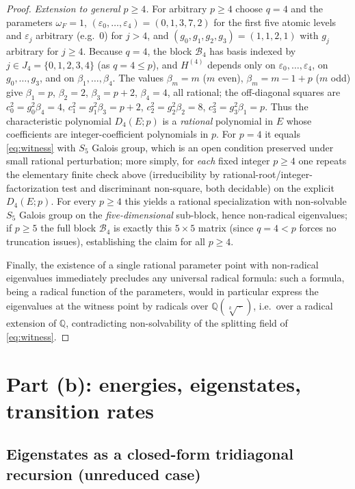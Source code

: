 \documentclass[12pt]{article}
\theoremstyle{definition}
\theoremstyle{remark}
\begin{document}
\begin{proof}
\emph{Extension to general $p\ge4$.} For arbitrary $p\ge4$ choose $q=4$ and the
parameters $\omega_F=1$, $(\varepsilon_0,\dots,\varepsilon_4)=(0,1,3,7,2)$ for the
first five atomic levels and $\varepsilon_j$ arbitrary (e.g.\ $0$) for $j>4$, and
$(g_0,g_1,g_2,g_3)=(1,1,2,1)$ with $g_j$ arbitrary for $j\ge4$. Because $q=4$, the
block $\mathcal B_4$ has basis indexed by $j\in J_4=\{0,1,2,3,4\}$ (as $q=4\le p$),
and $H^{(4)}$ depends only on $\varepsilon_0,\dots,\varepsilon_4$, on
$g_0,\dots,g_3$, and on $\beta_1,\dots,\beta_4$. The values
$\beta_m=m$ ($m$ even), $\beta_m=m-1+p$ ($m$ odd) give $\beta_1=p$, $\beta_2=2$,
$\beta_3=p+2$, $\beta_4=4$, all rational; the off-diagonal squares are
$c_0^2=g_0^2\beta_4=4$, $c_1^2=g_1^2\beta_3=p+2$, $c_2^2=g_2^2\beta_2=8$,
$c_3^2=g_3^2\beta_1=p$. Thus the characteristic polynomial $D_4(E;p)$ is a
\emph{rational} polynomial in $E$ whose coefficients are integer-coefficient
polynomials in $p$. For $p=4$ it equals \eqref{eq:witness} with $S_5$ Galois group,
which is an open condition preserved under small rational perturbation; more simply,
for \emph{each} fixed integer $p\ge4$ one repeats the elementary finite check above
(irreducibility by rational-root/integer-factorization test and discriminant
non-square, both decidable) on the explicit $D_4(E;p)$. For every $p\ge4$ this yields
a rational specialization with non-solvable $S_5$ Galois group on the
\emph{five-dimensional} sub-block, hence non-radical eigenvalues; if $p\ge5$ the full
block $\mathcal B_4$ is exactly this $5\times5$ matrix (since $q=4<p$ forces no
truncation issues), establishing the claim for all $p\ge4$.

Finally, the existence of a single rational parameter point with non-radical
eigenvalues immediately precludes any universal radical formula: such a formula,
being a radical function of the parameters, would in particular express the
eigenvalues at the witness point by radicals over $\mathbb Q(\sqrt[k]{\,\cdot\,})$,
i.e.\ over a radical extension of $\mathbb Q$, contradicting non-solvability of the
splitting field of \eqref{eq:witness}.
\end{proof}

\section{Part (b): energies, eigenstates, transition rates}

\subsection{Eigenstates as a closed-form tridiagonal recursion (unreduced case)}
\end{document}
